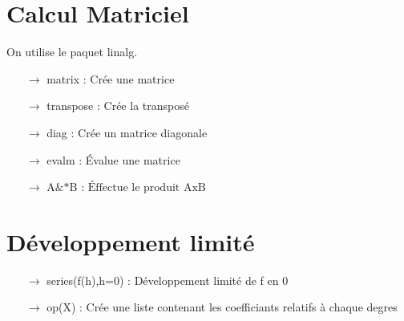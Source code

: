 \documentclass[a4paper,10pt,twocolumn]{report}
\begin{document}
\section{Calcul Matriciel}
On utilise le paquet linalg.
\begin{itemize}
 \item[$\rightarrow$] matrix : Crée une matrice 
\item[$\rightarrow$] transpose : Crée la transposé
\item[$\rightarrow$] diag : Crée un matrice diagonale
\item[$\rightarrow$] evalm : Évalue une matrice
\item[$\rightarrow$] $\mbox{A\&*B : Éffectue le produit AxB}$
\end{itemize}
\section{Développement limité}
\begin{itemize}
 \item[$\rightarrow$] series(f(h),h=0) : Développement limité de f en 0
 \item[$\rightarrow$] op(X) : Crée une liste contenant les coefficiants relatifs à chaque degres
\end{itemize}
\end{document}
